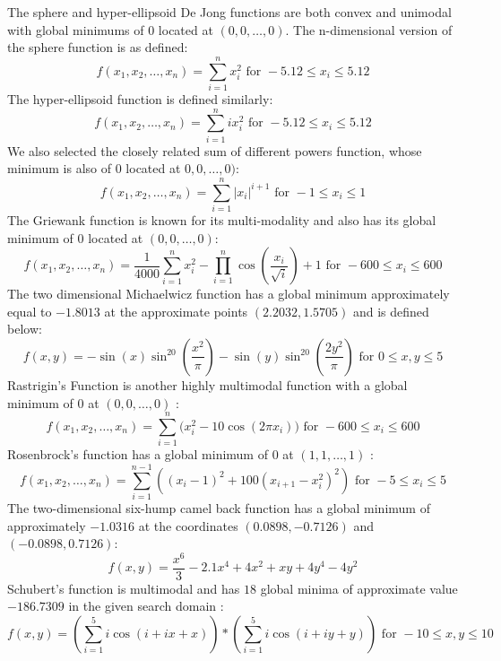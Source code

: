 %
%
The sphere and hyper-ellipsoid De Jong functions are both convex and unimodal with global minimums of $0$ located at $(0,0,\ldots,0)$. The n-dimensional version of the sphere function is as defined\cite{molga05,yang10}:
\[ f(x_1,x_2,\ldots,x_n) = \sum\limits_{i=1}^n x_i^2 \text{ for } -5.12 \leq x_i \leq 5.12 \]
%
%
The hyper-ellipsoid function is defined similarly\cite{molga05,yang10}:
\[ f(x_1,x_2,\ldots,x_n) = \sum\limits_{i=1}^n ix_i^2 \text{ for } -5.12 \leq x_i \leq 5.12\]
%
%
We also selected the closely related sum of different powers function, whose minimum is also of $0$ located at $0,0,\ldots,0)$\cite{molga05,yang10}:
\[ f(x_1,x_2,\ldots,x_n) = \sum\limits_{i=1}^n |x_i|^{i+1} \text{ for } -1 \leq x_i \leq 1\]
%
%
The Griewank function is known for its multi-modality and also has its global minimum of $0$ located at $(0,0,\ldots,0)$\cite{molga05,yang10}:
 \[ f(x_1,x_2,\ldots,x_n) = \frac{1}{4000}\sum\limits_{i=1}^n x_i^{2} - \prod\limits_{i=1}^{n} \cos(\frac{x_i}{\sqrt{i}})+1 \text{ for } -600 \leq x_i \leq 600\]
 The two dimensional Michaelwicz function has a global minimum approximately equal to $-1.8013$ at the approximate points $(2.2032,1.5705)$ and is defined below\cite{molga05,yang10}:
 \[ f(x,y) = -\sin(x)\sin^{20}(\frac{x^2}{\pi}) - \sin(y)\sin^{20}(\frac{2y^2}{\pi}) \text{ for } 0 \leq x,y \leq 5\]
 Rastrigin's Function is another highly multimodal function with a global minimum of $0$ at $(0,0,\ldots,0)$ \cite{molga05,yang10}:
 \[f(x_1,x_2,\ldots,x_n) = \sum\limits_{i=1}^n \big( x_i^2 - 10\cos(2\pi x_i) \big)\text{ for } -600 \leq x_i \leq 600\]
 Rosenbrock's function has a global minimum of 0 at $(1,1,\ldots,1)$ \cite{molga05,yang10}:
 \[f(x_1,x_2,\ldots,x_n) = \sum\limits_{i=1}^{n-1} ((x_i-1)^2 + 100(x_{i+1}-x_i^2)^2) \text{ for } -5 \leq x_i \leq 5\]
 The two-dimensional six-hump camel back function has a global minimum of approximately $-1.0316$ at the coordinates $(0.0898,-0.7126)$ and $(-0.0898,0.7126)$\cite{molga05,yang10}:
 \[f(x,y) = \frac{x^6}{3}-2.1x^4+4x^2+xy+4y^4-4y^2 \]
 Schubert's function is multimodal and has $18$ global minima of approximate value $-186.7309$ in the given search domain \cite{molga05,yang10}:
 \[ f(x,y) = (\sum\limits_{i=1}^{5} i\cos(i + ix + x)) * (\sum\limits_{i=1}^{5} i\cos(i + iy + y)) \text{ for } -10 \leq x,y \leq 10 \]

